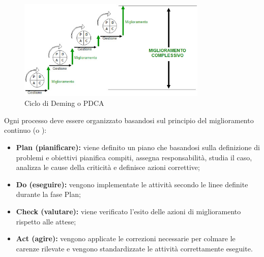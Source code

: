     \begin{figure}[h]
        \includegraphics[width=9cm]{src/CicloDeming/img/ciclodeming.jpg}
        \centering
        \caption{Ciclo di Deming o PDCA}
    \end{figure}
	Ogni processo deve essere organizzato basandosi sul principio del miglioramento continuo (o ):
	\begin{itemize}
		\item \textbf{Plan (pianificare):} viene definito un piano che basandosi sulla definizione di problemi e obiettivi pianifica compiti, assegna responsabilità, studia il caso, analizza le cause della criticità e definisce azioni correttive;
		\item \textbf{Do (eseguire):} vengono implementate le attività secondo le linee definite durante la fase Plan;
		\item \textbf{Check (valutare):} viene verificato l’esito delle azioni di miglioramento rispetto alle attese;
		\item \textbf{Act (agire):} vengono applicate le correzioni necessarie per colmare le carenze rilevate e vengono standardizzate le attività correttamente eseguite.
	\end{itemize}